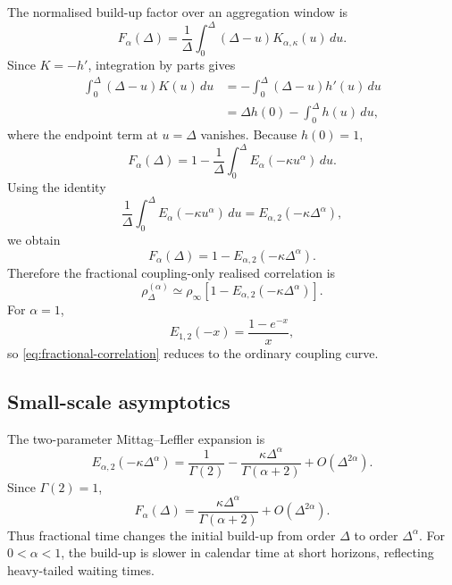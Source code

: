 \documentclass[5p,final]{elsarticle}
\begin{document}
The normalised build-up factor over an aggregation window is
\begin{equation}
F_\alpha(\Delta)
=\frac{1}{\Delta}\int_0^\Delta(\Delta-u)K_{\alpha,\kappa}(u)\,du.
\end{equation}
Since $K=-h'$, integration by parts gives
\begin{align}
\int_0^\Delta(\Delta-u)K(u)\,du
&=-\int_0^\Delta(\Delta-u)h'(u)\,du\\
&=\Delta h(0)-\int_0^\Delta h(u)\,du,
\end{align}
where the endpoint term at $u=\Delta$ vanishes.  Because $h(0)=1$,
\begin{equation}
F_\alpha(\Delta)
=1-\frac{1}{\Delta}\int_0^\Delta E_\alpha(-\kappa u^\alpha)\,du.
\end{equation}
Using the identity
\begin{equation}
\frac{1}{\Delta}\int_0^\Delta E_\alpha(-\kappa u^\alpha)\,du
=E_{\alpha,2}(-\kappa\Delta^\alpha),
\end{equation}
we obtain
\begin{equation}
F_\alpha(\Delta)=1-E_{\alpha,2}(-\kappa\Delta^\alpha).
\label{eq:fractional-build-factor}
\end{equation}
Therefore the fractional coupling-only realised correlation is
\begin{equation}
\rho^{(\alpha)}_\Delta
\simeq
\rho_\infty\left[1-E_{\alpha,2}(-\kappa\Delta^\alpha)
\right].
\label{eq:fractional-correlation}
\end{equation}
For $\alpha=1$,
\begin{equation}
E_{1,2}(-x)=\frac{1-e^{-x}}{x},
\end{equation}
so \eqref{eq:fractional-correlation} reduces to the ordinary coupling curve.

\subsection{Small-scale asymptotics}

The two-parameter Mittag--Leffler expansion \cite{Haubold2011MittagLeffler} is
\begin{equation}
E_{\alpha,2}(-\kappa\Delta^\alpha)
=\frac{1}{\Gamma(2)}-
\frac{\kappa\Delta^\alpha}{\Gamma(\alpha+2)}+O(\Delta^{2\alpha}).
\end{equation}
Since $\Gamma(2)=1$,
\begin{equation}
F_\alpha(\Delta)
=\frac{\kappa\Delta^\alpha}{\Gamma(\alpha+2)}+O(\Delta^{2\alpha}).
\end{equation}
Thus fractional time changes the initial build-up from order $\Delta$ to order $\Delta^\alpha$.  For $0<\alpha<1$, the build-up is slower in calendar time at short horizons, reflecting heavy-tailed waiting times.
\end{document}
